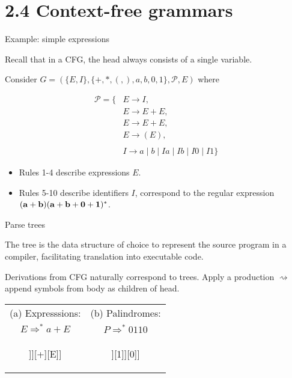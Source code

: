 \documentclass[handout]{beamer}
\begin{document}
\section{2.4 Context-free grammars}


\begin{frame}{Example: simple expressions}

	Recall that in a CFG, the head always consists of a single variable.

	\medskip

	Consider $G=(\{E,I\},\{+,*,(,),a,b,0,1\},\mathcal P,E)$ where
	
	\vspace{-15pt}
	\begin{align*}
		\mathcal P=\{&E\rightarrow I,\\
        &E\rightarrow E+E,\\
        &E\rightarrow E+E,\\
        &E\rightarrow (E),\\ \\
		&I\rightarrow a\mid b\mid Ia\mid Ib\mid I0\mid I1\}
	\end{align*}
	
	\begin{itemize}
		\item Rules 1-4 describe expressions $E$.
		\item Rules 5-10 describe identifiers $I$, correspond to the regular expression 
		$(\bf{a}+\bf{b})(\bf{a}+\bf{b}+\bf{0}+\bf{1})^* $.
	\end{itemize}

\end{frame}


\begin{frame}{Parse trees}

	The tree is the data structure of choice to represent the source program in a compiler, facilitating translation into executable code.

	Derivations from CFG naturally correspond to trees. Apply a production $\rightsquigarrow$ append symbols from body as children of head.

	\begin{center}
	\begin{tabular}{c c}
		(a) Expresssions:\hspace{2cm} &
		(b) Palindromes:\hspace{2cm} \\
		\alert{$E\Rightarrow^* a+E$} &
		\alert{$P\Rightarrow^* 0110$}\\
		\begin{forest}
			[E[E[I[a]]][+][E]]
		\end{forest}		
		&		
		\begin{forest}
			[P[0][P[1][P[$\epsilon$]][1]][0]]
		\end{forest}
	\end{tabular}
	\end{center}

\end{frame}
\end{document}
